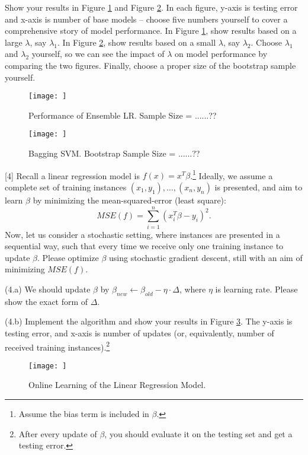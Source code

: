 \documentclass{llncs}
\begin{document}
Show your results in 
Figure \ref{fig:hw13_bagging_1} and 
Figure \ref{fig:hw13_bagging_2}. 
In each figure, y-axis is testing error 
and x-axis is number of base models 
-- choose five numbers yourself to 
cover a comprehensive story of model 
performance. 
In Figure \ref{fig:hw13_bagging_1}, 
show results based on a large 
$\lambda$, say $\lambda_{1}$.  
In Figure \ref{fig:hw13_bagging_2},  
show results based on a small 
$\lambda$, say $\lambda_{2}$. 
Choose $\lambda_{1}$ and $\lambda_{2}$ 
yourself, so we can see the impact 
of $\lambda$ on model performance by 
comparing the two figures. Finally, 
choose a proper size of the bootstrap 
sample yourself. 

\begin{figure}[h!]
\centering
\texttt{[image: ]}
\caption{Performance of Ensemble 
LR. Sample Size = ......??}
\label{fig:hw13_bagging_1}
\end{figure}

\begin{figure}[h!]
\centering
\texttt{[image: ]}
\caption{Bagging SVM. Bootstrap 
Sample Size = ......??}
\label{fig:hw13_bagging_2}
\end{figure}

\newpage 

[4] Recall a linear regression 
model is $f(x) = x^{T} \beta$.\footnote{Assume the bias term is included in $\beta$.} 
Ideally, we assume a complete set of 
training instances $(x_{1}, y_{1}), 
\ldots, (x_{n}, y_{n})$ is presented, 
and aim to learn $\beta$ by minimizing 
the mean-squared-error (least square): 
\begin{equation}
MSE(f) = \sum_{i=1}^{n} 
(x_{i}^{T} \beta - y_{i})^{2}. 
\end{equation}
Now, let us consider a stochastic setting, 
where instances are presented in a sequential
way, such that every time we receive only 
one training instance to update $\beta$. 
Please optimize $\beta$ using stochastic 
gradient descent, still with an aim of 
minimizing $MSE(f)$. 

(4.a) We should update $\beta$ 
by $\beta_{new} \leftarrow \beta_{old} 
- \eta \cdot \Delta$, where $\eta$ 
is learning rate. 
Please show the exact form of $\Delta$. 

(4.b) Implement the algorithm and 
show your results in 
Figure \ref{fig:hw13_online}. 
The y-axis is testing error, and 
x-axis is number of updates (or, 
equivalently, number of received 
training instances).\footnote{After 
every update of $\beta$, you
should evaluate it on the testing 
set and get a testing error.} 

\begin{figure}[h!]
\centering
\texttt{[image: ]}
\caption{Online Learning of the 
Linear Regression Model.}
\label{fig:hw13_online}
\end{figure}
\end{document}

